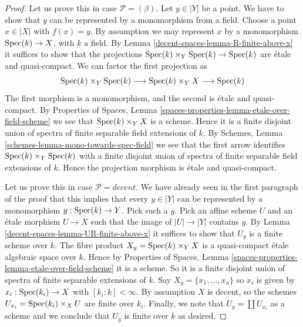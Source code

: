 \begin{proof}
Let us prove this in case $\mathcal{P} = (\beta)$. Let $y \in |Y|$ be
a point. We have to show that $y$ can be represented by a monomorphism
from a field. Choose a point $x \in |X|$ with $f(x) = y$.
By assumption we may represent $x$ by a monomorphism
$\operatorname{Spec}(k) \to X$, with $k$ a field. By
Lemma \ref{decent-spaces-lemma-R-finite-above-x}
it suffices to show that the projections
$\operatorname{Spec}(k) \times_Y \operatorname{Spec}(k) \to \operatorname{Spec}(k)$
are \'etale and quasi-compact. We can factor the first projection as
$$
\operatorname{Spec}(k) \times_Y \operatorname{Spec}(k)
\longrightarrow
\operatorname{Spec}(k) \times_Y X
\longrightarrow
\operatorname{Spec}(k)
$$
The first morphism is a monomorphism, and the second is \'etale and
quasi-compact. By
Properties of Spaces,
Lemma \ref{spaces-properties-lemma-etale-over-field-scheme}
we see that $\operatorname{Spec}(k) \times_Y X$ is a scheme. Hence it is a
finite disjoint union of spectra of finite separable field extensions
of $k$. By
Schemes, Lemma \ref{schemes-lemma-mono-towards-spec-field}
we see that the first arrow identifies
$\operatorname{Spec}(k) \times_Y \operatorname{Spec}(k)$ with a finite disjoint
union of spectra of finite separable field extensions of $k$.
Hence the projection morphism is \'etale and quasi-compact.

\medskip\noindent
Let us prove this in case $\mathcal{P} = decent$.
We have already seen in the first paragraph of the proof that this implies
that every $y \in |Y|$ can be represented by a monomorphism
$y : \operatorname{Spec}(k) \to Y$. Pick such a $y$. Pick an affine
scheme $U$ and an \'etale morphism $U \to X$ such that the image
of $|U| \to |Y|$ contains $y$. By
Lemma \ref{decent-spaces-lemma-UR-finite-above-x}
it suffices to show that $U_y$ is a finite scheme over $k$. The fibre
product $X_y = \operatorname{Spec}(k) \times_Y X$ is a quasi-compact \'etale
algebraic space over $k$. Hence by
Properties of Spaces,
Lemma \ref{spaces-properties-lemma-etale-over-field-scheme}
it is a scheme. So it is a finite disjoint union of spectra of
finite separable extensions of $k$. Say $X_y = \{x_1, \ldots, x_n\}$
so $x_i$ is given by  $x_i : \operatorname{Spec}(k_i) \to X$ with
$[k_i : k] < \infty$. By assumption $X$ is decent, so the schemes
$U_{x_i} = \operatorname{Spec}(k_i) \times_X U$ are finite over $k_i$.
Finally, we note that $U_y = \coprod U_{x_i}$ as a scheme and we conclude
that $U_y$ is finite over $k$ as desired.


\end{proof}

